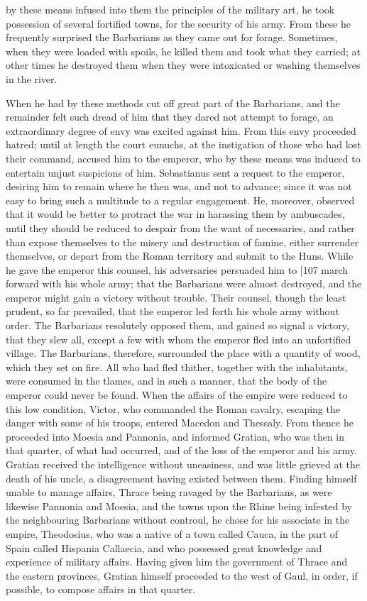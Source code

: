 by these means infused into them the principles of the military art, he took possession of several fortified towns, for the security of his army. From these he frequently surprised the Barbarians as they came out for forage. Sometimes, when they were loaded with spoils, he killed them and took what they carried; at other times he destroyed them when they were intoxicated or washing themselves in the river.

When he had by these methods cut off great part of the Barbarians, and the remainder felt such dread of him that they dared not attempt to forage, an extraordinary degree of envy was excited against him. From this envy proceeded hatred; until at length the court eunuchs, at the instigation of those who had lost their command, accused him to the emperor, who by these means was induced to entertain unjust suspicions of him. Sebastianus sent a request to the emperor, desiring him to remain where he then was, and not to advance; since it was not easy to bring such a multitude to a regular engagement. He, moreover, observed that it would be better to protract the war in harassing them by ambuscades, until they should be reduced to despair from the want of necessaries, and rather than expose themselves to the misery and destruction of famine, either surrender themselves, or depart from the Roman territory and submit to the Huns. While he gave the emperor this counsel, his adversaries persuaded him to
|107
march forward with his whole army; that the Barbarians were almost destroyed, and the emperor might gain a victory without trouble. Their counsel, though the least prudent, so far prevailed, that the emperor led forth his whole army without order. The Barbarians resolutely opposed them, and gained so signal a victory, that they slew all, except a few with whom the emperor fled into an unfortified village. The Barbarians, therefore, surrounded the place with a quantity of wood, which they set on fire. All who had fled thither, together with the inhabitants, were consumed in the tlames, and in such a manner, that the body of the emperor could never be found. When the affairs of the empire were reduced to this low condition, Victor, who commanded the Roman cavalry, escaping the danger with some of his troops, entered Macedon and Thessaly. From thence he proceeded into Moesia and Pannonia, and informed Gratian, who was then in that quarter, of what had occurred, and of the loss of the emperor and his army. Gratian received the intelligence without uneasiness, and was little grieved at the death of his uncle, a disagreement having existed between them. Finding himself unable to manage affairs, Thrace being ravaged by the Barbarians, as were likewise Pannonia and Moesia, and the towns upon the Rhine being infested by the neighbouring Barbarians without controul, he chose for his associate in the empire, Theodosius, who was a native of a town called Cauca, in the part of Spain called Hispania Callaecia, and who possessed great knowledge and experience of military affairs. Having given him the government of Thrace and the eastern provinces, Gratian himself proceeded to the west of Gaul, in order, if possible, to compose affairs in that quarter.

